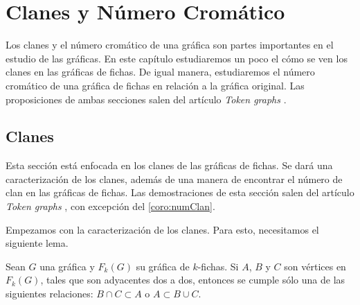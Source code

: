 \chapter{Clanes y N\'umero Crom\'atico}%
\label{cap:Clique-ChromNum}
Los clanes y el n\'umero crom\'atico de una gr\'afica son partes importantes en
el estudio de las gr\'aficas. En este cap\'itulo estudiaremos un poco el c\'omo
se ven los clanes en las gr\'aficas de fichas. De igual manera, estudiaremos el
n\'umero crom\'atico de una gr\'afica de fichas en relaci\'on a la gr\'afica
original. Las proposiciones de ambas secciones salen del art\'iculo
\textit{Token graphs} \cite{fabilaToken}. 

\section{Clanes}%
\label{sec:clanes}

Esta secci\'on est\'a enfocada en los clanes de las gr\'aficas de fichas. Se
dar\'a una caracterizaci\'on de los clanes, adem\'as de una manera de encontrar
el n\'umero de clan en las gr\'aficas de fichas. Las demostraciones de esta
secci\'on salen del art\'iculo \textit{Token graphs} \cite{fabilaToken}, con
excepci\'on del \cref{coro:numClan}.

Empezamos con la caracterizaci\'on de los clanes. Para esto, necesitamos el
siguiente lema.

\begin{lema}%
\label{lem:K3}
    Sean $G$ una gr\'afica y $F_k(G)$ su gr\'afica de $k$-fichas. Si $A$, $B$ y
    $C$ son v\'ertices en $F_k(G)$, tales que son adyacentes dos a dos, entonces
    se cumple s\'olo una de las siguientes relaciones: $B \cap C \subset A$ o $A
    \subset B \cup C$.
\end{lema}

